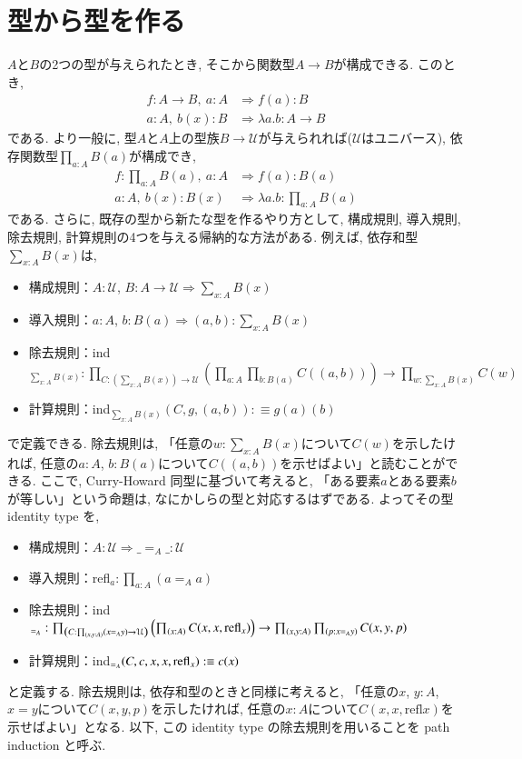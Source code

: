 \documentclass[11pt]{jsreport}
\theoremstyle{mystyle}
\newcommand{\Lra}{\Longrightarrow}
\newcommand{\U}{\mathcal{U}}
\newcommand{\refl}{\textrm{refl}}
\newcommand{\0}{\textbf{0}}
\begin{document}
\section{型から型を作る} \label{sec inductive}
$A$と$B$の2つの型が与えられたとき, そこから関数型$A \to B$が構成できる. このとき, 
\begin{align*}
  f : A \to B,\ a : A &\Lra f(a) : B \\
  a : A,\ b(x) : B &\Lra \lambda a. b : A \to B 
\end{align*}
である. より一般に, 型$A$と$A$上の型族$B \to \U$が与えられれば($\U$はユニバース), 依存関数型$\prod_{a : A} B(a)$が構成でき, 
\begin{align*}
  f :\prod_{a : A} B(a),\ a : A &\Lra f(a) : B(a) \\
  a : A,\ b(x) : B(x) &\Lra \lambda a. b : \prod_{a : A} B(a) 
\end{align*}
である. さらに, 既存の型から新たな型を作るやり方として, 構成規則, 導入規則, 除去規則, 計算規則の4つを与える帰納的な方法がある. 例えば, 依存和型$\sum_{x : A} B(x)$は, 
\begin{itemize}
  \item 構成規則：$A : \U$, $B : A \to \U \Lra \sum_{x : A} B(x)$
  \item 導入規則：$a : A$, $b : B(a) \Lra (a, b) : \sum_{x : A} B(x)$
  \item 除去規則：ind$_{\sum_{x : A} B(x)} : \prod_{C : (\sum_{x : A} B(x)) \to \U} 
                               \left(\prod_{a : A} \prod_{b : B(a)} C((a, b)) \right) \to 
                                      \prod_{w : \sum_{x : A} B(x)} C(w)$
  \item 計算規則：ind$_{\sum_{x : A} B(x)} (C, g, (a, b)) :\equiv g(a)(b)$
\end{itemize}
で定義できる. 除去規則は, 「任意の$w : \sum_{x : A} B(x)$について$C(w)$を示したければ, 任意の$a : A$, $b : B(a)$について$C((a, b))$を示せばよい」と読むことができる. 
ここで, Curry-Howard 同型に基づいて考えると, 「ある要素$a$とある要素$b$が等しい」という命題は, なにかしらの型と対応するはずである. よってその型 identity type を, 
\begin{itemize}
  \item 構成規則：$A : \U \Lra \_ =_A \_ : \U$
  \item 導入規則：refl$_a : \prod_{a : A} (a =_A a)$
  \item 除去規則：ind$_{=_A} : \prod_{\left( C : \prod_{(x, y : A)} (x =_A y) \to \U \right)} 
                                       \left( \prod_{(x : A)} C(x, x, {\rm refl}_x) \right) \to
                                       \prod_{(x, y : A)} \prod_{(p : x =_A y)} C(x, y, p)$
  \item 計算規則：ind$_{=_A} (C, c, x, x, {\rm refl}_x) : \equiv c(x)$
\end{itemize}
と定義する. 除去規則は, 依存和型のときと同様に考えると, 「任意の$x$, $y : A$, $x = y$について$C(x, y, p)$を示したければ, 任意の$x : A$について$C(x, x, \refl{x})$を示せばよい」となる. 以下, この identity type の除去規則を用いることを path induction と呼ぶ. 
\end{document}
